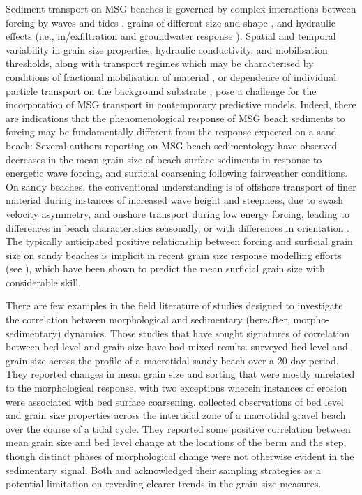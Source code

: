 \documentclass[jmse,article,submit,pdftex,moreauthors]{Definitions/mdpi}
\begin{document}

Sediment transport on MSG beaches is governed by complex interactions between forcing by waves and tides \citep{Nordstrom_Jackson1993}, grains of different size and shape \citep{Stark_etal2014, Stark_Hay2016}, and hydraulic effects (i.e., in/exfiltration and groundwater response \citep{Horn2006}). Spatial and temporal variability in grain size properties, hydraulic conductivity, and mobilisation thresholds, along with transport regimes which may be characterised by conditions of fractional mobilisation of material \citep{Wilcock_Crowe2003}, or dependence of individual particle transport on the background substrate \citep{Carter_Orford1993}, pose a challenge for the incorporation of MSG transport in contemporary predictive models. Indeed, there are indications that the phenomenological response of MSG beach sediments to forcing may be fundamentally different from the response expected on a sand beach: Several authors reporting on MSG beach sedimentology \citep{Nordstrom_Jackson1993, Pontee_etal2004, Curtiss_etal2009, Miller_etal2011, Hay_etal2014} have observed decreases in the mean grain size of beach surface sediments in response to energetic wave forcing, and surficial coarsening following fairweather conditions. On sandy beaches, the conventional understanding is of offshore transport of finer material during instances of increased wave height and steepness, due to swash velocity asymmetry, and onshore transport during low energy forcing, leading to differences in beach characteristics seasonally, or with differences in orientation \citep{Bascom1951}. The typically anticipated positive relationship between forcing and surficial grain size on sandy beaches is implicit in recent grain size response modelling efforts (see \citet{Prodger_etal2016}), which have been shown to predict the mean surficial grain size with considerable skill.

There are few examples in the field literature of studies designed to investigate the correlation between morphological and sedimentary (hereafter, morpho-sedimentary) dynamics. Those studies that have sought signatures of correlation between bed level and grain size have had mixed results. \citet{Masselink_etal2007} surveyed bed level and grain size across the profile of a macrotidal sandy beach over a 20 day period. They reported changes in mean grain size and sorting that were mostly unrelated to the morphological response, with two exceptions wherein instances of erosion were associated with bed surface coarsening. \citet{Austin_Buscombe2008} collected observations of bed level and grain size properties across the intertidal zone of a macrotidal gravel beach over the course of a tidal cycle. They reported some positive correlation between mean grain size and bed level change at the locations of the berm and the step, though distinct phases of morphological change were not otherwise evident in the sedimentary signal. Both \citet{Masselink_etal2007} and \citet{Austin_Buscombe2008} acknowledged their sampling strategies as a potential limitation on revealing clearer trends in the grain size measures.
\end{document}
